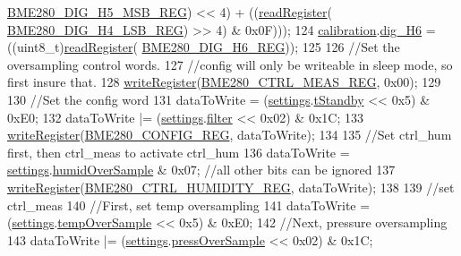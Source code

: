 \begin{DoxyCode}
      \hyperlink{_cool_spark_fun_b_m_e280_8h_ae7e42b75f0268a4303b77699fb8be834}{BME280\_DIG\_H5\_MSB\_REG}) << 4) + ((\hyperlink{class_b_m_e280_a1bbd14c8591966df531e40085342ff71}{readRegister}(
      \hyperlink{_cool_spark_fun_b_m_e280_8h_a722ff6a68e3db9eec127b191f2530a20}{BME280\_DIG\_H4\_LSB\_REG}) >> 4) & 0x0F)));
124     \hyperlink{class_b_m_e280_aa7a28484b6f5eb6f43261ea25016fbf8}{calibration}.\hyperlink{struct_sensor_calibration_a2f8c842c4becfce11e04c00168a9be0f}{dig\_H6} = ((uint8\_t)\hyperlink{class_b_m_e280_a1bbd14c8591966df531e40085342ff71}{readRegister}(
      \hyperlink{_cool_spark_fun_b_m_e280_8h_aa53163d82db48577fdb9a83112226e2c}{BME280\_DIG\_H6\_REG}));
125 
126     \textcolor{comment}{//Set the oversampling control words.}
127     \textcolor{comment}{//config will only be writeable in sleep mode, so first insure that.}
128     \hyperlink{class_b_m_e280_afcff21c342725246bf415d7f0e4d04f0}{writeRegister}(\hyperlink{_cool_spark_fun_b_m_e280_8h_a34483b4a562393f91fe3f01d676abb88}{BME280\_CTRL\_MEAS\_REG}, 0x00);
129     
130     \textcolor{comment}{//Set the config word}
131     dataToWrite = (\hyperlink{class_b_m_e280_af06253eb2f8ad4b5fabb858bc4a973bf}{settings}.\hyperlink{struct_sensor_settings_a7098be3c1df0271dc9bc0fb45c1e9bb9}{tStandby} << 0x5) & 0xE0;
132     dataToWrite |= (\hyperlink{class_b_m_e280_af06253eb2f8ad4b5fabb858bc4a973bf}{settings}.\hyperlink{struct_sensor_settings_a69dc95368069a0f408a141d4c2cbf045}{filter} << 0x02) & 0x1C;
133     \hyperlink{class_b_m_e280_afcff21c342725246bf415d7f0e4d04f0}{writeRegister}(\hyperlink{_cool_spark_fun_b_m_e280_8h_a70c225069ef92e5da90ee45362f7ba69}{BME280\_CONFIG\_REG}, dataToWrite);
134     
135     \textcolor{comment}{//Set ctrl\_hum first, then ctrl\_meas to activate ctrl\_hum}
136     dataToWrite = \hyperlink{class_b_m_e280_af06253eb2f8ad4b5fabb858bc4a973bf}{settings}.\hyperlink{struct_sensor_settings_a4a02fc7708071b88ccf610e3f7ed9d55}{humidOverSample} & 0x07; \textcolor{comment}{//all other bits can be ignored}
137     \hyperlink{class_b_m_e280_afcff21c342725246bf415d7f0e4d04f0}{writeRegister}(\hyperlink{_cool_spark_fun_b_m_e280_8h_a6da31fc4446b80cf5a830a5df45a5743}{BME280\_CTRL\_HUMIDITY\_REG}, dataToWrite);
138     
139     \textcolor{comment}{//set ctrl\_meas}
140     \textcolor{comment}{//First, set temp oversampling}
141     dataToWrite = (\hyperlink{class_b_m_e280_af06253eb2f8ad4b5fabb858bc4a973bf}{settings}.\hyperlink{struct_sensor_settings_abdedc9d05f4850c58005313486958073}{tempOverSample} << 0x5) & 0xE0;
142     \textcolor{comment}{//Next, pressure oversampling}
143     dataToWrite |= (\hyperlink{class_b_m_e280_af06253eb2f8ad4b5fabb858bc4a973bf}{settings}.\hyperlink{struct_sensor_settings_a85ba10cad25b479bba9cb42c6400ab21}{pressOverSample} << 0x02) & 0x1C;

\end{DoxyCode}
